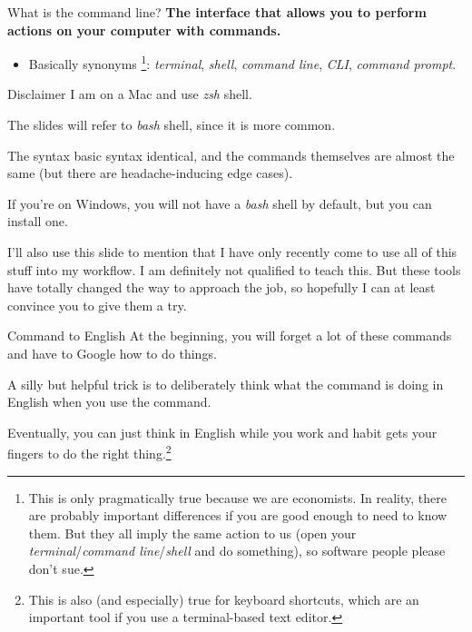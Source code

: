 
\begin{frame}{What is the command line?}
    \textbf{The interface that allows you to perform actions on your computer with commands.}

    \begin{itemize}
        \item Basically synonyms \footnote{This is only pragmatically true because we are economists.
        In reality, there are probably important differences if you are good enough to need to know them.
        But they all imply the same action to us
        (open your \textit{terminal}/\textit{command line}/\textit{shell} and do something),
        so software people please don't sue.}:
    \textit{terminal}, \textit{shell}, \textit{command line}, \textit{CLI}, \textit{command prompt}.
    \end{itemize}
\end{frame}

\begin{frame}{Disclaimer}
    \footnotesize
    I am on a Mac and use \textit{zsh} shell.

    The slides will refer to \textit{bash} shell, since it is more common.

    The syntax basic syntax identical, and the commands themselves are almost the same
    (but there are headache-inducing edge cases).

    If you're on Windows, you will not have a \textit{bash} shell by default,
    but you can install one.

    I'll also use this slide to mention that I have only recently come to use
    all of this stuff into my workflow.
    I am definitely not qualified to teach this.
    But these tools have totally changed the way to approach the job,
    so hopefully I can at least convince you to give them a try.

\end{frame}

\begin{frame}{Command to English}
    \stretchon
    At the beginning, you will forget a lot of these commands and have to Google
    how to do things.

    A silly but helpful trick is to deliberately think what the command is doing in English
    when you use the command.

    Eventually, you can just think in English while you work and habit gets your
    fingers to do the right thing.\footnote{This is also (and especially) true
    for keyboard shortcuts, which are an important tool if you use a terminal-based
    text editor.}

\end{frame}

